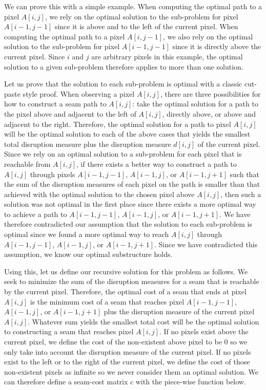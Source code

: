 \documentclass[11pt]{article}
\begin{document}
We can prove this with a simple example. When computing the optimal path to a pixel $A[i,j]$, we rely on the optimal solution to the sub-problem for pixel $A[i-1,j-1]$ since it is above and to the left of the current pixel. When computing the optimal path to a pixel $A[i,j-1]$, we also rely on the optimal solution to the sub-problem for pixel $A[i-1,j-1]$ since it is directly above the current pixel. Since $i$ and $j$ are arbitrary pixels in this example, the optimal solution to a given sub-problem therefore applies to more than one solution.

Let us prove that the solution to each sub-problem is optimal with a classic cut-paste style proof. When observing a pixel $A[i,j]$, there are three possibilities for how to construct a seam path to $A[i,j]$: take the optimal solution for a path to the pixel above and adjacent to the left of $A[i,j]$, directly above, or above and adjacent to the right. Therefore, the optimal solution for a path to pixel $A[i,j]$ will be the optimal solution to each of the above cases that yields the smallest total disruption measure plus the disruption measure $d[i,j]$ of the current pixel. Since we rely on an optimal solution to a sub-problem for each pixel that is reachable from $A[i,j]$, if there exists a better way to construct a path to $A[i,j]$ through pixels $A[i-1,j-1]$, $A[i-1,j]$, or $A[i-1,j+1]$ such that the sum of the disruption measures of each pixel on the path is smaller than that achieved with the optimal solution to the chosen pixel above $A[i,j]$, then such a solution was not optimal in the first place since there exists a more optimal way to achieve a path to $A[i-1,j-1]$, $A[i-1,j]$, or $A[i-1,j+1]$. We have therefore contradicted our assumption that the solution to each sub-problem is optimal since we found a more optimal way to reach $A[i,j]$ through $A[i-1,j-1]$, $A[i-1,j]$, or $A[i-1,j+1]$. Since we have contradicted this assumption, we know our optimal substructure holds.

Using this, let us define our recursive solution for this problem as follows. We seek to minimize the sum of the disruption measures for a seam that is reachable by the current pixel. Therefore, the optimal cost of a seam that ends at pixel $A[i,j]$ is the minimum cost of a seam that reaches pixel $A[i-1,j-1]$, $A[i-1,j]$, or $A[i-1,j+1]$ plus the disruption measure of the current pixel $A[i,j]$. Whatever sum yields the smallest total cost will be the optimal solution to constructing a seam that reaches pixel $A[i,j]$. If no pixels exist above the current pixel, we define the cost of the non-existent above pixel to be 0 so we only take into account the disruption measure of the current pixel. If no pixels exist to the left or to the right of the current pixel, we define the cost of those non-existent pixels as infinite so we never consider them an optimal solution. We can therefore define a seam-cost matrix $c$ with the piece-wise function below.
\end{document}
